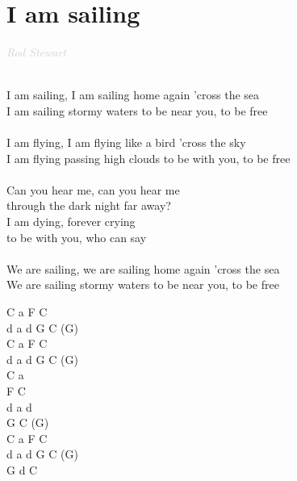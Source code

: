 \documentclass[a5paper, 10pt]{book}
\begin{document}
\newpage
\section{I am sailing}\textcolor{lightgray}{\textit{Rod Stewart
}}\\~\\
\begin{minipage}[t]{0.80\textwidth}
I am sailing, I am sailing home again 'cross the sea\\
I am sailing stormy waters to be near you, to be free\\
\\
I am flying, I am flying like a bird 'cross the sky\\
I am flying passing high clouds to be with you, to be free\\
\\
\hspace*{5mm}Can you hear me, can you hear me \\
\hspace*{5mm}through the dark night far away?\\
\hspace*{5mm}I am dying, forever crying \\
\hspace*{5mm}to be with you, who can say\\
\\
We are sailing, we are sailing home again 'cross the sea\\
We are sailing stormy waters to be near you, to be free\\
\end{minipage}
\begin{minipage}[t]{0.2\textwidth}
C a F C\\
d a d G C (G)\\

C a F C\\
d a d G C (G)\\

C a\\ F C\\
d a d\\ G C (G)\\

C a F C\\
d a d G C (G)\\
G d C\\
\end{minipage}

\newpage
\end{document}
